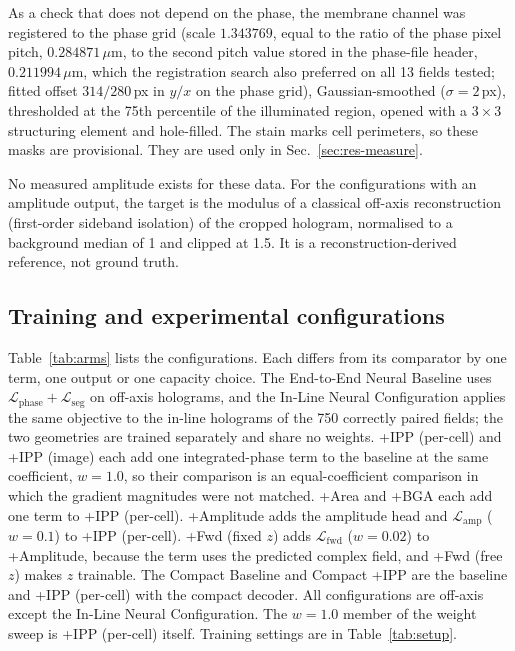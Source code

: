 \documentclass[11pt]{article}
\newcommand{\Lphase}{\mathcal{L}_\mathrm{phase}}
\newcommand{\Lseg}{\mathcal{L}_\mathrm{seg}}
\newcommand{\Lfwd}{\mathcal{L}_\mathrm{fwd}}
\newcommand{\Lamp}{\mathcal{L}_\mathrm{amp}}
\begin{document}
As a check that does not depend on the phase, the membrane channel was
registered to the phase grid (scale $1.343769$, equal to the ratio of the
phase pixel pitch, $0.284871\,\mu$m, to the second pitch value stored in the
phase-file header, $0.211994\,\mu$m, which the registration search also
preferred on all 13 fields tested; fitted offset $314/280$\,px in $y/x$ on the
phase grid), Gaussian-smoothed ($\sigma=2$\,px), thresholded at the 75th
percentile of the illuminated region, opened with a $3\times3$ structuring
element and hole-filled. The stain marks cell perimeters, so these masks are
provisional. They are used only in Sec.~\ref{sec:res-measure}.

No measured amplitude exists for these data. For the configurations with an
amplitude output, the target is the modulus of a classical off-axis
reconstruction (first-order sideband isolation) of the cropped hologram,
normalised to a background median of 1 and clipped at 1.5. It is a
reconstruction-derived reference, not ground truth.

\subsection{Training and experimental configurations}
\label{sec:arms}

Table~\ref{tab:arms} lists the configurations. Each differs from its comparator
by one term, one output or one capacity choice. The End-to-End Neural Baseline
uses $\Lphase+\Lseg$ on off-axis holograms, and the In-Line Neural
Configuration applies the same objective to the in-line holograms of the 750
correctly paired fields; the two geometries are trained separately and share no
weights. +IPP (per-cell) and +IPP (image) each add one integrated-phase term to
the baseline at the same coefficient, $w=1.0$, so their comparison is an
equal-coefficient comparison in which the gradient magnitudes were not matched.
+Area and +BGA each add one term to +IPP (per-cell). +Amplitude adds the
amplitude head and $\Lamp$ ($w=0.1$) to +IPP (per-cell). +Fwd (fixed $z$) adds
$\Lfwd$ ($w=0.02$) to +Amplitude, because the term uses the predicted complex
field, and +Fwd (free $z$) makes $z$ trainable. The Compact Baseline and
Compact +IPP are the baseline and +IPP (per-cell) with the compact decoder. All
configurations are off-axis except the In-Line Neural Configuration. The $w=1.0$
member of the weight sweep is +IPP (per-cell) itself. Training settings are in
Table~\ref{tab:setup}.


\end{document}
